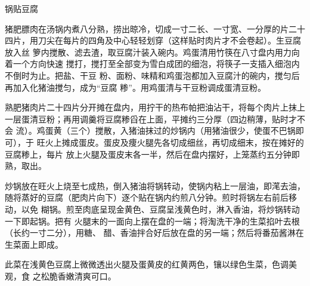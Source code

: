 \begin{recipe}{锅贴豆腐}

\ingredients


\preparation

\step 猪肥膘肉在汤锅内煮八分熟，捞出晾冷，切成一寸二长、一寸宽、一分厚的片二十
四片，用刀尖在每片的四角及中心轻轻划穿（这样贴时肉片才不会卷起）。生豆腐放入丝
箩内搅散、滤去渣，取豆腐汁装入碗内。鸡蛋清用竹筷在八寸盘内用力向着一个方向快速
搅打，搅打至全部变为雪白成团的细泡，将筷子一支插入细泡内不倒时为止。把盐、干豆
粉、面粉、味精和鸡蛋泡都加入豆腐汁的碗内，搅匀后再加入化猪油搅匀，成为“豆腐
糁”。用鸡蛋清与干豆粉调成蛋清豆粉。

\step 熟肥猪肉片二十四片分开摊在盘内，用拧干的热布帕把油沾干，将每个肉片上抹上
一层蛋清豆粉；再用调羹将豆腐糁舀在上面，平摊约三分厚（四边稍薄，贴时才不会
流）。鸡蛋黄（三个）搅散，入猪油抹过的炒锅内（用猪油很少，使蛋不巴锅即可），于
旺火上摊成蛋皮。蛋皮及痩火腿先各切成细丝，再切成细末，按在摊好的豆腐糁上，每片
放上火腿及蛋皮末各一半，然后在盘内摆好，上笼蒸约五分钟即熟，取出。

\step 炒锅放在旺火上烧至七成热，倒入猪油将锅转动，使锅内粘上一层油，即滗去油，
随将蒸好的豆腐（肥肉片向下）逐个贴在锅内约煎八分钟。煎时将锅左右前后移动，以免
糊锅。煎至肉底呈现金黄色、豆腐呈浅黄色时，淋入香油，将炒锅转动一下即起锅。把有
火腿末的一面向上摆在盘的一端；将淘洗干净的生菜掐叶去根（长约一寸二分），用糖、
醋、香油拌合好后放在盘的另一端；然后将番茄酱淋在生菜面上即成。

\features

此菜在浅黄色豆腐上微微透出火腿及蛋黄皮的红黄两色，镶以绿色生菜，色调美观，食
之松脆香嫩清爽可口。

\end{recipe}

